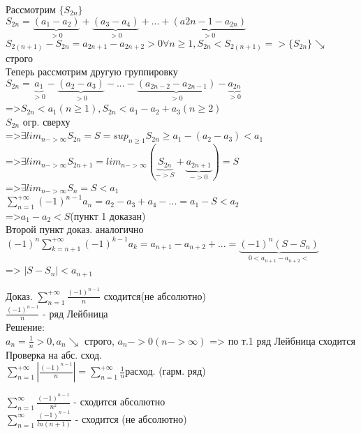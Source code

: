 \begin{Proof}
    Рассмотрим $\{S_{2n}\}$\\
    $S_{2n}=\underbrace{(a_1-a_2)}_{>0}+\underbrace{(a_3-a_4)}_{>0}+...+\underbrace{(a{2n-1}-a_{2n})}_{>0}$\\
    $S_{2(n+1)}-S_{2n}=a_{2n+1}-a_{2n+2}>0 \forall n \geqslant 1, S_{2n}<S_{2(n+1)}=>\{S_{2n}\} \searrow$ строго\\
    Теперь рассмотрим другую группировку\\
    $S_{2n}=\underbrace{a_1}_{>0}-\underbrace{(a_2-a_3)}_{>0}-...-\underbrace{(a_{2n-2}-a_{2n-1})}_{>0}-\underbrace{a_{2n}}_{>0}$\\
    =>$S_{2n}<a_1(n\geqslant 1), S_{2n}<a_1-a_2+a_3(n\geqslant 2)$\\
    $S_{2n}$ огр. сверху\\
    =>$\exists lim_{n->\infty}S_{2n}=S=sup_{n\geqslant 1} S_{2n}\geqslant a_1-(a_2-a_3)<a_1$\\
    =>$\exists lim_{n->\infty}S_{2n+1}= lim_{n->\infty}(\underbrace{S_{2n}}_{->S}+\underbrace{a_{2n+1}}_{->0})=S$\\
    =>$\exists lim_{n->\infty}S_{n}=S<a_1$\\
    $\sum_{n=1}^{+\infty} (-1)^{n-1} a_n=a_2-a_3+a_4-...=a_1-S<a_2$\\
    =>$a_1-a_2<S$(пункт 1 доказан)\\
    Второй пункт доказ. аналогично\\
    $(-1)^n\sum_{k=n+1}^{+\infty} (-1)^{k-1} a_k=a_{n+1}-a_{n+2}+...=\underbrace{(-1)^n(S-S_n)}_{0<a_{n+1}-a_{n+2}<}$\\
    => $|S-S_n|<a_{n+1}$\\
\end{Proof}

\begin{Example}
    Доказ. $\sum_{n=1}^{+\infty} \frac{(-1)^{n-1}}{n}$ сходится(не абсолютно)\\
    $\frac{(-1)^{n-1}}{n}$ - ряд Лейбница\\
    Решение:\\
    $a_n=\frac{1}{n}>0, {a_n}\searrow$ строго, $a_n->0 (n->\infty)$ => по т.1 ряд Лейбница сходится\\
    Проверка на абс. сход.\\
    $\sum_{n=1}^{+\infty}| \frac{(-1)^{n-1}}{n}|=\sum_{n=1}^{+\infty}\frac{1}{n}$расход. (гарм. ряд)\\
\end{Example}


\begin{Example}
	$\sum^{\infty}_{n=1} \frac{(-1)^{n-1}}{n^2}$ - сходится абсолютно\\
	$\sum^{\infty}_{n=1} \frac{(-1)^{n-1}}{ln(n+1)}$ - сходится (не абсолютно)\\
\end{Example}

